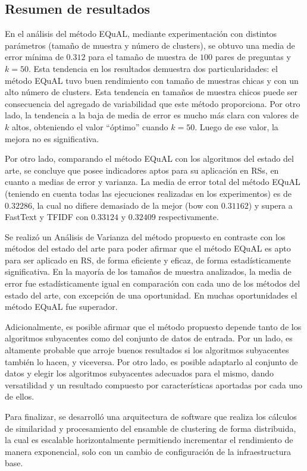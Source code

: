 \subsection{Resumen de resultados}

En el análisis del método EQuAL, mediante experimentación con distintos parámetros (tamaño de muestra y número de clusters), se obtuvo una media de error mínima de \(0.312\) para el tamaño de muestra de \(100\) pares de preguntas y \(k = 50\). Esta tendencia en los resultados demuestra dos particularidades: el método EQuAL tuvo buen rendimiento con tamaño de muestras chicas y con un alto número de clusters. Esta tendencia en tamaños de muestra chicos puede ser consecuencia del agregado de variabilidad que este método proporciona. Por otro lado, la tendencia a la baja de media de error es mucho más clara con valores de \(k\) altos, obteniendo el valor “óptimo” cuando \(k = 50\). Luego de ese valor, la mejora no es significativa.

\bigskip Por otro lado, comparando el método EQuAL con los algoritmos del estado del arte, se concluye que posee indicadores aptos para su aplicación en RSs, en cuanto a medias de error y varianza. La media de error total del método EQuAL (teniendo en cuenta todas las ejecuciones realizadas en los experimentos) es de \(0.32286\), la cual no difiere demasiado de la mejor (bow con \(0.31162\)) y supera a FastText y TFIDF con \(0.33124\) y \(0.32409\) respectivamente.

\bigskip Se realizó un Análisis de Varianza del método propuesto en contraste con los métodos del estado del arte para poder afirmar que el método EQuAL es apto para ser aplicado en RS, de forma eficiente y eficaz, de forma estadísticamente significativa. En la mayoría de los tamaños de muestra analizados, la media de error fue estadísticamente igual en comparación con cada uno de los métodos del estado del arte, con excepción de una oportunidad. En muchas oportunidades el método EQuAL fue superador.

\bigskip Adicionalmente, es posible afirmar que el método propuesto depende tanto de los algoritmos subyacentes como del conjunto de datos de entrada. Por un lado, es altamente probable que arroje buenos resultados si los algoritmos subyacentes también lo hacen, y viceversa. Por otro lado, es posible adaptarlo al conjunto de datos y elegir los algoritmos subyacentes adecuados para el mismo, dando versatilidad y un resultado compuesto por características aportadas por cada uno de ellos.

\bigskip Para finalizar, se desarrolló una arquitectura de software que realiza los cálculos de similaridad y procesamiento del ensamble de clustering de forma distribuida, la cual es escalable horizontalmente permitiendo incrementar el rendimiento de manera exponencial, solo con un cambio de configuración de la infraestructura base.
